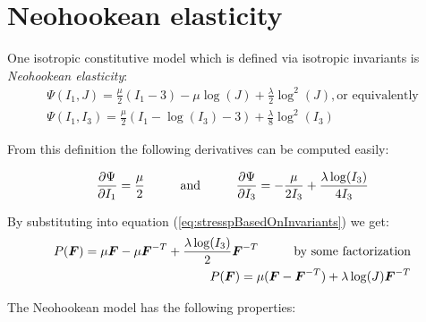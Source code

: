 \section{Neohookean elasticity}
One isotropic constitutive model which is defined via isotropic invariants is \textit{Neohookean elasticity}:
\begin{align}
\label{eq:NeohookeanStrainEnergy}
 \Psi(I_1, J) = \frac{\mu}{2}(I_1-3)-\mu \log(J)+ \frac{\lambda}{2} \log^2(J), \text{or equivalently}\nonumber\\
 \Psi(I_1, I_3)=\frac{\mu}{2}(I_1-\log(I_3)-3)+\frac{\lambda}{8}\log^2(I_3)
\end{align}

From this definition the following derivatives can be computed easily:

\begin{gather*}
 \frac{\partial \Psi}{\partial I_1}=\frac{\mu}{2}\hspace{10mm}\text{and}\hspace{10mm}\frac{\partial \Psi}{\partial I_3}=-\frac{\mu}{2I_3}+\frac{\lambda \log(I_3)}{4 I_3}
\end{gather*}

By substituting into equation (\ref{eq:stresspBasedOnInvariants}) we get:
\begin{align}
\label{eq:NeohookeanStress}
 P(\boldsymbol{F})=\mu\boldsymbol{F}-\mu\boldsymbol{F}^{-T}+\frac{\lambda \log (I_3) }{2}\boldsymbol{F}^{-T}\hspace{10mm}\text{by some factorization}\nonumber\\
 P(\boldsymbol{F})=\mu(\boldsymbol{F}-\boldsymbol{F}^{-T})+\lambda\log(J)\boldsymbol{F}^{-T}
\end{align}

The Neohookean model has the following properties:

